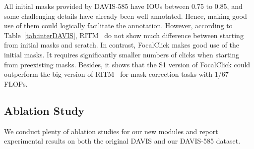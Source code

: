 \documentclass[10pt,twocolumn,letterpaper]{article}
\begin{document}
All initial masks provided by DAVIS-585 have IOUs between 0.75 to 0.85, and some challenging details have already been well annotated. Hence, making good use of them could logically facilitate the annotation. However, according to  Table~\ref{tab:interDAVIS}, RITM~\cite{sofiiuk2021ritm} do not show much difference between starting from initial masks and scratch.   In contrast, FocalClick makes good use of the initial masks. It requires significantly smaller numbers of clicks when starting from preexisting masks. Besides, it shows that the S1 version of FocalClick could outperform the big version of RITM~\cite{sofiiuk2021ritm} for mask correction tasks with 1/67 FLOPs.  





\subsection{ Ablation Study}
We conduct plenty of ablation studies for our new modules and report experimental results on both the original DAVIS  and our DAVIS-585 dataset. \\

\begin{table}[t]
\small
\begin{center}
\end{center}
\vspace{-5mm}
\caption{ Ablation studies on both interactive segmentation from scratch and interactive mask correction. `TC', `FC', `PM' denote Target Crop, Focus Crop, and Progressive Merge. `NoC', `NoF' stand for the Number of Clicks and the Number of Failures. }
\label{tab:ablation}
\end{table}
\end{document}

